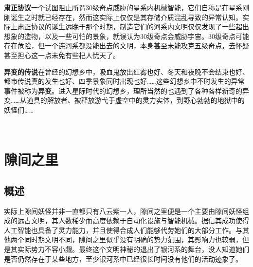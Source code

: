 \documentclass[10.5pt,compsoc,UTF8]{CjC}
\theoremstyle{mystyle}
\begin{document}
{\textbf{肃正协议}\quad 一个试图阻止所谓30级奇点威胁的星系内机械智能，它们自称是在星系刚刚诞生之时就已经存在，然而这实际上仅仅是其存储介质混乱导致的异常认知。实际上肃正协议的诞生远晚于那个时期，制造它们的河系内文明仅仅发现了一些超出想象的造物，以及一些可怕的景象，就误认为30级奇点会威胁宇宙。30级奇点可能存在危险，但一个连河系都没能出去的文明，本身甚至未能攻克五级奇点，去怀疑甚至担心这一点未免有些杞人忧天了。

\textbf{异变的传说}\quad 在曾经的幻想乡中，吸血鬼放出红雾也好、冬天和夜晚不会结束也好、都市传说真的发生也好、四季景象同时出现也好……这些幻想乡中不时发生的异常事件被称为\textbf{异变}。进入星际时代的幻想乡，理所当然的也遇到了各种各样新奇的异变……从道具的解放者、被释放游弋于虚空中的灵力实体，到野心勃勃的地狱中的妖怪们……\newline\newline\newline\newline\newline

\begin{center}
\\
\vspace {5mm}




\end{center}

\section{隙间之里}

\subsection{\color{gray}概述}

实际上隙间妖怪并非一直都只有八云紫一人，隙间之里便是一个主要由隙间妖怪组成的远古文明，其人数稀少而高度依赖于自动化设施与智能机械。据信其成功使得人工智能也具备了灵力能力，并且使得合成人们能够代劳她们的大部分工作。与其他两个同时期文明不同，隙间之里似乎没有明确的势力范围，其影响力也较弱，但是其实际势力不容小觑。最终这个文明神秘的退出了银河系的舞台，没人知道她们是否仍然存在于某些地方，至少银河系中已经很长时间没有他们的活动迹象了。

}
\end{document}

